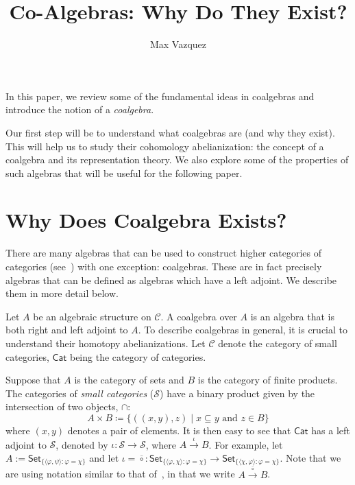 \documentclass[a4paper,reqno,oneside]{article}
\begin{document}
\title{Co-Algebras: Why Do They Exist?}
\author{Max Vazquez}
\maketitle


In this paper, we review some of the fundamental ideas in coalgebras and introduce the notion of a \textit{coalgebra}. 

Our first step will be to understand what coalgebras are (and why they exist). This will help us to study their cohomology abelianization: the concept of a coalgebra and its representation theory. We also explore some of the properties of such algebras that will be useful for the following paper.

\section{Why Does Coalgebra Exists?}

There are many algebras that can be used to construct higher categories of categories (see~\cite[Example 5.8]{AbramskyLurieFreedBradyShulman}) with one exception: coalgebras. These are in fact precisely algebras that can be defined as algebras which have a left adjoint. We describe them in more detail below.

Let $A$ be an algebraic structure on $\mathcal{C}$. A coalgebra over $A$ is an algebra that is both right and left adjoint to $A$. To describe coalgebras in general, it is crucial to understand their homotopy abelianizations. Let $\mathcal{C}$ denote the category of small categories, $\mathsf{Cat}$ being the category of categories.

Suppose that $A$ is the category of sets and $B$ is the category of finite products. The categories of \textit{small categories} ($\mathcal{S}$) have a binary product given by the intersection of two objects, $\cap$: 
$$A \times B \coloneqq \{((x,y),z)\mid x \subseteq y \text{ and } z \in B \}$$ 
where $(x,y)$ denotes a pair of elements. It is then easy to see that $\mathsf{Cat}$ has a left adjoint to $\mathcal{S}$, denoted by $\iota: \mathcal{S} \to \mathcal{S}$, where $A \xrightarrow{\iota} B$. For example, let $A := \mathsf{Set}_{\{\langle \varphi, \psi \rangle : \varphi = \chi\}}$ and let $\iota = \overline{\circ}: \mathsf{Set}_{\{\langle \varphi, \chi \rangle : \varphi = \chi\}} \to \mathsf{Set}_{\{\langle \chi, \varphi \rangle : \varphi = \chi\}}$. Note that we are using notation similar to that of~\cite{AbramskyLurieFreedBradyShulman}, in that we write $A \xrightarrow{\overline{\circ}} B$.
\end{document}
